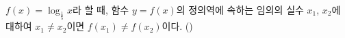 $f(x)=\log_{\frac{1}{5}} x$라 할 때, 함수 $y=f(x)$의 정의역에 속하는 임의의 실수 $x_1$, $x_2$에 대하여 $x_1\ne x_2$이면 $f(x_1)\ne f(x_2)$이다. \hfill (\hspace*{2.4em})
